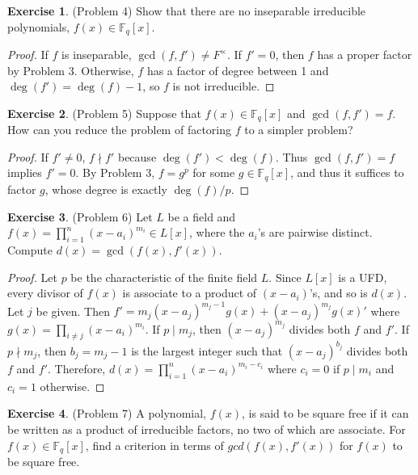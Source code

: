 \documentclass[12pt, psamsfonts]{amsart}
\theoremstyle{definition}
\newtheorem*{exer}{Exercise}
\theoremstyle{remark}
\numberwithin{equation}{section}
\begin{document}
\begin{exer}{(Problem 4)}
  Show that there are no inseparable irreducible polynomials, $f(x) \in \mathbb{F}_q[x]$.
\end{exer}

\begin{proof}
  If $f$ is inseparable, $\gcd(f, f') \ne F^{\times}$.
  If $f' = 0$, then $f$ has a proper factor by Problem 3.
  Otherwise, $f$ has a factor of degree between 1 and $\deg(f') = \deg(f) - 1$, so $f$ is not irreducible.
\end{proof}

\begin{exer}{(Problem 5)}
  Suppose that $f(x) \in \mathbb{F}_q[x]$ and $\gcd(f, f') = f$.
  How can you reduce the problem of factoring $f$ to a simpler problem?
\end{exer}

\begin{proof}
  If $f' \ne 0$, $f \nmid f'$ because $\deg(f') < \deg(f)$.
  Thus $\gcd(f, f') = f$ implies $f' = 0$.
  By Problem 3, $f = g^p$ for some $g \in \mathbb{F}_q[x]$, and thus it suffices to factor $g$, whose degree is exactly $\deg(f) / p$.
\end{proof}

\begin{exer}{(Problem 6)}
  Let $L$ be a field and $f(x) = \prod_{i=1}^{n} (x - a_i)^{m_i} \in L[x]$, where the $a_i$'s are pairwise distinct.
  Compute $d(x) = \gcd(f(x), f'(x))$.
\end{exer}

\begin{proof}
  Let $p$ be the characteristic of the finite field $L$.
  Since $L[x]$ is a UFD, every divisor of $f(x)$ is associate to a product of $(x - a_i)$'s, and so is $d(x)$.
  Let $j$ be given.
  Then $f' = m_j(x - a_j)^{m_j - 1}g(x) + (x - a_j)^{m_j}g(x)'$ where $g(x) = \prod_{i \ne j}(x - a_i)^{m_i}$.
  If $p \mid m_j$, then $(x - a_j)^{m_j}$ divides both $f$ and $f'$.
  If $p \nmid m_j$, then $b_j = m_j - 1$ is the largest integer such that $(x - a_j)^{b_j}$ divides both $f$ and $f'$.
  Therefore, $d(x) = \prod_{i=1}^{n}(x - a_i)^{m_i - c_i}$ where $c_i = 0$ if $p \mid m_i$ and $c_i = 1$ otherwise.
\end{proof}

\begin{exer}{(Problem 7)}
  A polynomial, $f(x)$, is said to be square free if it can be written as a product of irreducible factors, no two of which are associate.
  For $f(x) \in \mathbb{F}_q[x]$, find a criterion in terms of $gcd(f(x), f'(x))$ for $f(x)$ to be square free.
\end{exer}
\end{document}
